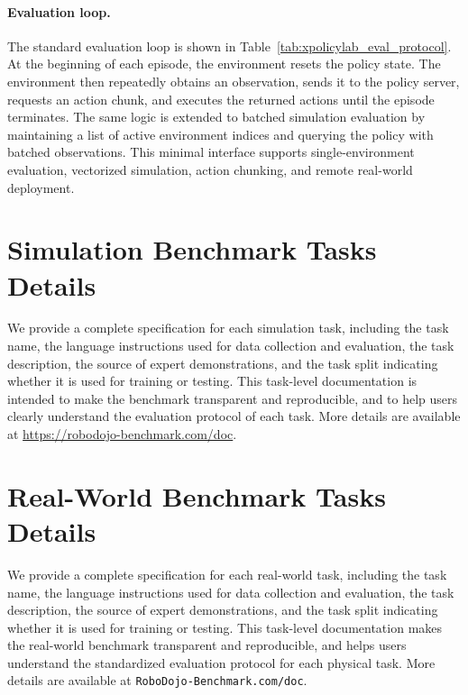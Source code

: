 \paragraph{Evaluation loop.}
The standard evaluation loop is shown in Table~\ref{tab:xpolicylab_eval_protocol}. At the beginning of each episode, the environment resets the policy state. The environment then repeatedly obtains an observation, sends it to the policy server, requests an action chunk, and executes the returned actions until the episode terminates. The same logic is extended to batched simulation evaluation by maintaining a list of active environment indices and querying the policy with batched observations. This minimal interface supports single-environment evaluation, vectorized simulation, action chunking, and remote real-world deployment.



\section{Simulation Benchmark Tasks Details}
\label{appendix:sim_benchmark_tasks_details}

We provide a complete specification for each simulation task, including the task name, the language instructions used for data collection and evaluation, the task description, the source of expert demonstrations, and the task split indicating whether it is used for training or testing. This task-level documentation is intended to make the benchmark transparent and reproducible, and to help users clearly understand the evaluation protocol of each task. More details are available at \href{https://robodojo-benchmark.com/doc}{https://robodojo-benchmark.com/doc}.




\section{Real-World Benchmark Tasks Details}
\label{appendix:real_benchmark_tasks_details}

We provide a complete specification for each real-world task, including the task name, the language instructions used for data collection and evaluation, the task description, the source of expert demonstrations, and the task split indicating whether it is used for training or testing. This task-level documentation makes the real-world benchmark transparent and reproducible, and helps users understand the standardized evaluation protocol for each physical task. More details are available at \texttt{RoboDojo-Benchmark.com/doc}.

